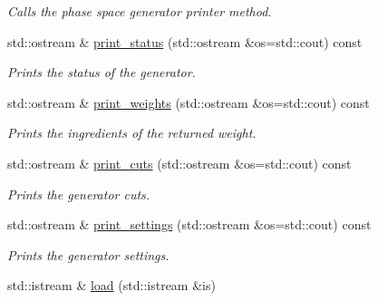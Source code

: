 \begin{DoxyCompactItemize}
\begin{DoxyCompactList}\small\item\em Calls the phase space generator printer method. \end{DoxyCompactList}\item 
\hypertarget{a00430_a1f20b9aabbfaa47a6594eb28cf9164b5}{std\-::ostream \& \hyperlink{a00430_a1f20b9aabbfaa47a6594eb28cf9164b5}{print\-\_\-status} (std\-::ostream \&os=std\-::cout) const }\label{a00430_a1f20b9aabbfaa47a6594eb28cf9164b5}

\begin{DoxyCompactList}\small\item\em Prints the status of the generator. \end{DoxyCompactList}\item 
\hypertarget{a00430_ac35a8c16fd72c4c6c38b6a44e75da07c}{std\-::ostream \& \hyperlink{a00430_ac35a8c16fd72c4c6c38b6a44e75da07c}{print\-\_\-weights} (std\-::ostream \&os=std\-::cout) const }\label{a00430_ac35a8c16fd72c4c6c38b6a44e75da07c}

\begin{DoxyCompactList}\small\item\em Prints the ingredients of the returned weight. \end{DoxyCompactList}\item 
\hypertarget{a00430_afa8b12752091958a7b2fd0f1fbc69c08}{std\-::ostream \& \hyperlink{a00430_afa8b12752091958a7b2fd0f1fbc69c08}{print\-\_\-cuts} (std\-::ostream \&os=std\-::cout) const }\label{a00430_afa8b12752091958a7b2fd0f1fbc69c08}

\begin{DoxyCompactList}\small\item\em Prints the generator cuts. \end{DoxyCompactList}\item 
\hypertarget{a00430_a609afaf01cf286a14aaf558a6517ec39}{std\-::ostream \& \hyperlink{a00430_a609afaf01cf286a14aaf558a6517ec39}{print\-\_\-settings} (std\-::ostream \&os=std\-::cout) const }\label{a00430_a609afaf01cf286a14aaf558a6517ec39}

\begin{DoxyCompactList}\small\item\em Prints the generator settings. \end{DoxyCompactList}\item 
\hypertarget{a00430_a82583956b01222747203c886bd546360}{std\-::istream \& \hyperlink{a00430_a82583956b01222747203c886bd546360}{load} (std\-::istream \&is)}\label{a00430_a82583956b01222747203c886bd546360}


\end{DoxyCompactItemize}
